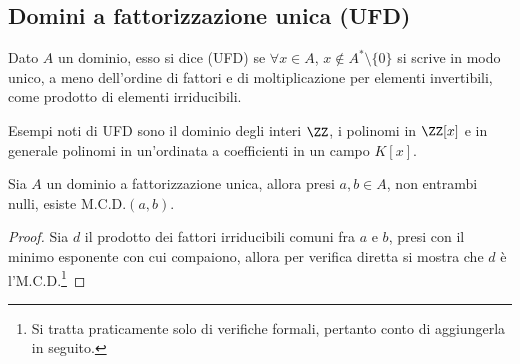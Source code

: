 \documentclass[11pt]{scrartcl}
\begin{document}
\newpage
\subsection{Domini a fattorizzazione unica (UFD)}
\begin{definition}
    Dato $A$ un dominio, esso si dice  (UFD) se $\forall x \in A$, $x \not\in A^*\setminus\{0\}$ si scrive in modo
    unico, a meno dell'ordine di fattori e di moltiplicazione per elementi invertibili, come prodotto di elementi irriducibili.
\end{definition}

\begin{example}
    Esempi noti di UFD sono il dominio degli interi $\ZZ$, i polinomi in $\ZZ[x]$ e in generale polinomi in un'ordinata a coefficienti in un campo $K[x]$.
\end{example}

\begin{proposition}
    Sia $A$ un dominio a fattorizzazione unica, allora presi $a,b \in A$, non entrambi nulli, esiste $\text{M.C.D.}(a,b)$.
\end{proposition}

\begin{proof}
    Sia $d$ il prodotto dei fattori irriducibili comuni fra $a$ e $b$, presi con il minimo esponente con cui compaiono,
    allora per verifica diretta si mostra che $d$ è l'M.C.D.\footnote{Si tratta praticamente solo di verifiche formali, pertanto conto di aggiungerla in seguito.}
\end{proof}
\end{document}

